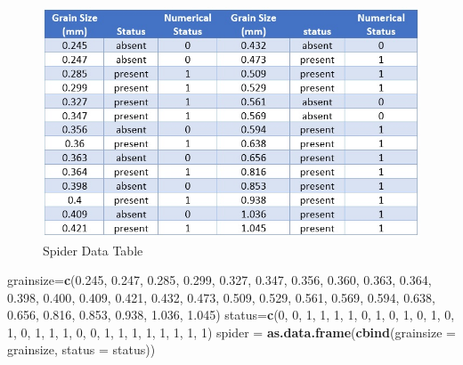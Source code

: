 \documentclass[
]{book}
\newenvironment{Shaded}{\begin{snugshade}}{\end{snugshade}}
\newcommand{\AttributeTok}[1]{\textcolor[rgb]{0.13,0.29,0.53}{#1}}
\newcommand{\DecValTok}[1]{\textcolor[rgb]{0.00,0.00,0.81}{#1}}
\newcommand{\FloatTok}[1]{\textcolor[rgb]{0.00,0.00,0.81}{#1}}
\newcommand{\FunctionTok}[1]{\textcolor[rgb]{0.13,0.29,0.53}{\textbf{#1}}}
\newcommand{\NormalTok}[1]{#1}
\newcommand{\OtherTok}[1]{\textcolor[rgb]{0.56,0.35,0.01}{#1}}
\begin{document}
\begin{figure}

{\centering \includegraphics[width=0.8\linewidth]{img04/w04-SpiderDataTable} 

}

\caption{Spider Data Table}\label{fig:unnamed-chunk-95}
\end{figure}

\begin{Shaded}
\begin{Highlighting}[]
\NormalTok{grainsize}\OtherTok{=}\FunctionTok{c}\NormalTok{(}\FloatTok{0.245}\NormalTok{, }\FloatTok{0.247}\NormalTok{, }\FloatTok{0.285}\NormalTok{, }\FloatTok{0.299}\NormalTok{, }\FloatTok{0.327}\NormalTok{, }\FloatTok{0.347}\NormalTok{, }\FloatTok{0.356}\NormalTok{, }\FloatTok{0.360}\NormalTok{, }\FloatTok{0.363}\NormalTok{, }\FloatTok{0.364}\NormalTok{, }
            \FloatTok{0.398}\NormalTok{, }\FloatTok{0.400}\NormalTok{, }\FloatTok{0.409}\NormalTok{, }\FloatTok{0.421}\NormalTok{, }\FloatTok{0.432}\NormalTok{, }\FloatTok{0.473}\NormalTok{, }\FloatTok{0.509}\NormalTok{, }\FloatTok{0.529}\NormalTok{, }\FloatTok{0.561}\NormalTok{, }\FloatTok{0.569}\NormalTok{, }
            \FloatTok{0.594}\NormalTok{, }\FloatTok{0.638}\NormalTok{, }\FloatTok{0.656}\NormalTok{, }\FloatTok{0.816}\NormalTok{, }\FloatTok{0.853}\NormalTok{, }\FloatTok{0.938}\NormalTok{, }\FloatTok{1.036}\NormalTok{, }\FloatTok{1.045}\NormalTok{)}
\NormalTok{status}\OtherTok{=}\FunctionTok{c}\NormalTok{(}\DecValTok{0}\NormalTok{, }\DecValTok{0}\NormalTok{, }\DecValTok{1}\NormalTok{, }\DecValTok{1}\NormalTok{, }\DecValTok{1}\NormalTok{, }\DecValTok{1}\NormalTok{, }\DecValTok{0}\NormalTok{, }\DecValTok{1}\NormalTok{, }\DecValTok{0}\NormalTok{, }\DecValTok{1}\NormalTok{, }\DecValTok{0}\NormalTok{, }\DecValTok{1}\NormalTok{, }\DecValTok{0}\NormalTok{, }\DecValTok{1}\NormalTok{, }\DecValTok{0}\NormalTok{, }\DecValTok{1}\NormalTok{, }\DecValTok{1}\NormalTok{, }\DecValTok{1}\NormalTok{, }\DecValTok{0}\NormalTok{, }\DecValTok{0}\NormalTok{, }\DecValTok{1}\NormalTok{, }\DecValTok{1}\NormalTok{, }\DecValTok{1}\NormalTok{, }\DecValTok{1}\NormalTok{, }
         \DecValTok{1}\NormalTok{, }\DecValTok{1}\NormalTok{, }\DecValTok{1}\NormalTok{, }\DecValTok{1}\NormalTok{)}
\NormalTok{spider }\OtherTok{=} \FunctionTok{as.data.frame}\NormalTok{(}\FunctionTok{cbind}\NormalTok{(}\AttributeTok{grainsize =}\NormalTok{ grainsize, }\AttributeTok{status =}\NormalTok{ status))}
\end{Highlighting}
\end{Shaded}
\end{document}
